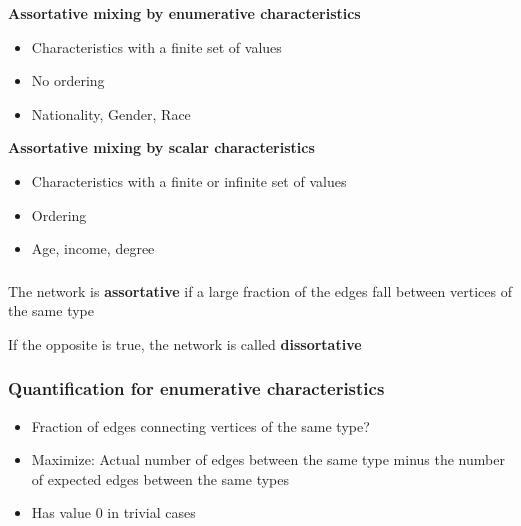\documentclass{beamer}
\begin{document}
\begin{frame}
    \centering
        \vspace{2em}
    {\bf Assortative mixing by enumerative characteristics}

        \vspace{1em}
        \begin{itemize}
        \setlength\itemsep{1em}
            \item{Characteristics with a finite set of values} 
            \item{No ordering} 
            \item{Nationality, Gender, Race} 
        \end{itemize}
        \vspace{1em}
    {\bf Assortative mixing by scalar characteristics}
        \vspace{1em}
        \begin{itemize}
        \setlength\itemsep{1em}
            \item{Characteristics with a finite or infinite set of values}
            \item{Ordering}
            \item{Age, income, degree}
        \end{itemize}
        \pause
\end{frame}
\begin{frame}
    \frametitle{}
    \centering
        \vspace{1em}
        The network is {\bf assortative} if a large fraction of the edges fall between vertices of the same type

        \vspace{1em}
        If the opposite is true, the network is called {\bf dissortative}
\end{frame}
\begin{frame}
    \frametitle{Quantification for enumerative characteristics}
        
    \begin{itemize}
    \setlength\itemsep{2em}
        \pause
        \item{Fraction of edges connecting vertices of the same type?}
        
        \pause
        \item{Maximize: Actual number of edges between the same type minus the number of expected edges between the same types}

        \pause
        \item{Has value $0$ in trivial cases}

    \end{itemize}
\end{frame}
\end{document}
